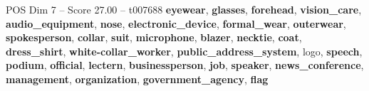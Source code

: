\begin{textsample}{POS Dim 7 – Score 27.00 – t007688}  \label{ex:f7_pos_023}
\textbf{eyewear}, \textbf{glasses}, \textbf{forehead}, \textbf{vision\_care}, \textbf{audio\_equipment}, \textbf{nose}, \textbf{electronic\_device}, \textbf{formal\_wear}, \textbf{outerwear}, \textbf{spokesperson}, \textbf{collar}, \textbf{suit}, \textbf{microphone}, \textbf{blazer}, \textbf{necktie}, \textbf{coat}, \textbf{dress\_shirt}, \textbf{white-collar\_worker}, \textbf{public\_address\_system}, logo, \textbf{speech}, \textbf{podium}, \textbf{official}, \textbf{lectern}, \textbf{businessperson}, \textbf{job}, \textbf{speaker}, \textbf{news\_conference}, \textbf{management}, \textbf{organization}, \textbf{government\_agency}, \textbf{flag}

\end{textsample}
